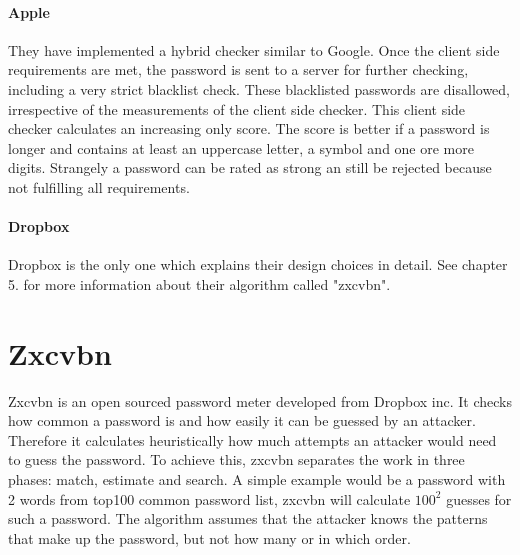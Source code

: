 \documentclass[12pt,a4paper]{article}
\begin{document}
\paragraph{Apple}
They have implemented a hybrid checker similar to Google. Once the client side requirements are met, the password is sent to a server for further checking, including a very strict blacklist check. These blacklisted passwords are disallowed, irrespective of the measurements of the client side checker. This client side checker calculates an increasing only score. The score is better if a password is longer and contains at least an uppercase letter, a symbol and one ore more digits. Strangely a password can be rated as strong an still be rejected because not fulfilling all requirements.

\paragraph{Dropbox}
Dropbox is the only one which explains their design choices in detail. See chapter 5. for more information about their algorithm called "zxcvbn".




%
%
%
%

\section{Zxcvbn}
\label{sec:zxcvbn}
Zxcvbn is an open sourced password meter developed from Dropbox inc. It checks how common a password is and how easily it can be guessed by an attacker. Therefore it calculates heuristically how much attempts an attacker would need to guess the password. To achieve this, zxcvbn separates the work in three phases: match, estimate and search. A simple example would be a password with 2 words from top100 common password list, zxcvbn will calculate $ 100^{2} $ guesses for such a password. The algorithm assumes that the attacker knows the patterns that make up the password, but not how many or in which order.


\end{document}
